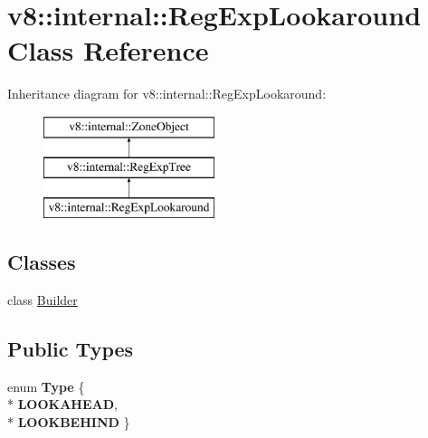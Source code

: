 \hypertarget{classv8_1_1internal_1_1_reg_exp_lookaround}{}\section{v8\+:\+:internal\+:\+:Reg\+Exp\+Lookaround Class Reference}
\label{classv8_1_1internal_1_1_reg_exp_lookaround}
Inheritance diagram for v8\+:\+:internal\+:\+:Reg\+Exp\+Lookaround\+:\begin{figure}[H]
\begin{center}
\leavevmode
\includegraphics[height=3.000000cm]{classv8_1_1internal_1_1_reg_exp_lookaround}
\end{center}
\end{figure}
\subsection*{Classes}
\begin{DoxyCompactItemize}
\item 
class \hyperlink{classv8_1_1internal_1_1_reg_exp_lookaround_1_1_builder}{Builder}
\end{DoxyCompactItemize}
\subsection*{Public Types}
\begin{DoxyCompactItemize}
\item 
enum {\bfseries Type} \{ \\*
{\bfseries L\+O\+O\+K\+A\+H\+E\+AD}, 
\\*
{\bfseries L\+O\+O\+K\+B\+E\+H\+I\+ND}
 \}\hypertarget{classv8_1_1internal_1_1_reg_exp_lookaround_a5982c9f5930a64e1547da44da96836db}{}\label{classv8_1_1internal_1_1_reg_exp_lookaround_a5982c9f5930a64e1547da44da96836db}

\end{DoxyCompactItemize}
